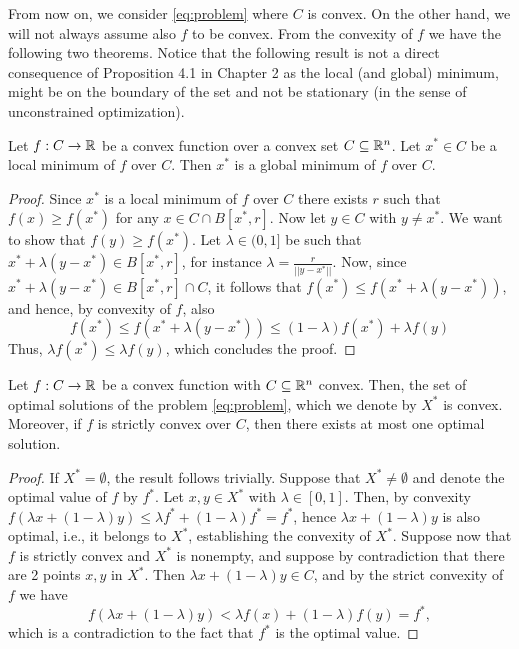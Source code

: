 \documentclass[10pt,a4paper]{article}
\begin{document}
From now on, we consider \eqref{eq:problem} where $C$ is convex. On the other hand, we will not always assume also $f$ to be convex. From the convexity of $f$ we have the following two theorems. Notice that the following result is not a direct consequence of Proposition 4.1 in Chapter 2 as the local (and global) minimum, might be on the boundary of the set and not be stationary (in the sense of unconstrained optimization).
\begin{theorem}[global=local in convex optimization] Let $f:C\to\mathbb{R}$ be a convex function over a convex set $C\subseteq \mathbb{R}^n$. Let $x^*\in C$ be a local minimum of $f$ over $C$. Then $x^*$ is a global minimum of $f$ over $C$.	
\end{theorem}
\begin{proof}
	Since $x^*$ is a local minimum of $f$ over $C$ there exists $r$ such that $f(x)\geq f(x^*)$ for any $x\in C \cap B[x^*,r]$. Now let $y\in C$ with $y\neq x^*$. We want to show that $f(y) \geq f(x^*)$. Let $\lambda\in(0,1]$ be such that $x^*+\lambda(y-x^*)\in B[x^*,r]$, for instance $\lambda=\frac{r}{||y-x^*||}$. Now, since $x^*+\lambda (y-x^*) \in B[x^*,r]\cap C$, it follows that $f(x^*)\leq f(x^*+\lambda (y-x^*))$, and hence, by convexity of $f$, also 
	\begin{equation*}
		f(x^*)\leq f(x^*+\lambda (y-x^*)) \leq (1-\lambda)f(x^*) +\lambda f(y)
	\end{equation*}
Thus, $\lambda f(x^*) \leq \lambda f(y)$, which concludes the proof.
\end{proof}
\begin{theorem}\label{thm:unique}
	Let $f:C\to \mathbb{R}$ be a convex function with $C\subseteq \mathbb{R}^n$ convex. Then, the set of optimal solutions of the problem \eqref{eq:problem}, which we denote by $X^*$ is convex. Moreover, if $f$ is strictly convex over $C$, then there exists at most one optimal solution.
\end{theorem}
\begin{proof}
	If $X^*=\emptyset$, the result follows trivially. Suppose that $X^*\neq\emptyset$ and denote the optimal value of $f$ by $f^*$. Let $x,y\in X^*$ with $\lambda\in[0,1]$. Then, by convexity $f(\lambda x+(1-\lambda)y)\leq \lambda f^* +(1-\lambda)f^*= f^*$, hence $\lambda x +(1-\lambda)y$ is also optimal, i.e., it belongs to $X^*$, establishing the convexity of $X^*$. Suppose now that $f$ is strictly convex and $X^*$ is nonempty, and suppose by contradiction that there are 2 points $x,y$ in $X^*$. Then $\lambda x +(1-\lambda)y \in C$, and by the strict convexity of $f$ we have 
	\begin{equation*}
		f(\lambda x +(1-\lambda) y) < \lambda f(x) + (1-\lambda) f(y) = f^*,
	\end{equation*}
which is a contradiction to the fact that $f^*$ is the optimal value.
\end{proof}
\end{document}
